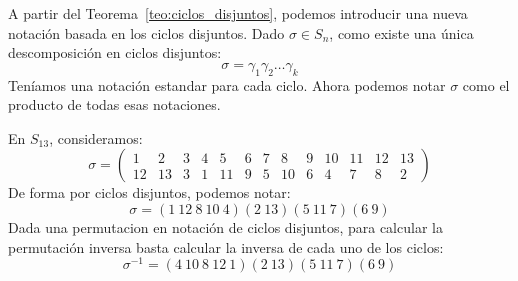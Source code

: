 \begin{notacion}
    A partir del Teorema~\ref{teo:ciclos_disjuntos}, podemos introducir una nueva notación basada en los ciclos disjuntos. Dado $\sigma\in S_n$, como existe una única descomposición en ciclos disjuntos:
    \begin{equation*}
        \sigma=\gamma_1\gamma_2\ldots\gamma_k
    \end{equation*}
    Teníamos una notación estandar para cada ciclo. Ahora podemos notar $\sigma$ como el producto de todas esas notaciones.
\end{notacion}

\begin{ejemplo}
    En $S_{13}$, consideramos:
    \begin{equation*}
        \sigma = \left(\begin{array}{ccccccccccccc}
                1 & 2 & 3 & 4 & 5 & 6 & 7 & 8 & 9 & 10 & 11 & 12 & 13 \\
                12 & 13 & 3 & 1 & 11 & 9 & 5 & 10 & 6 & 4 & 7 & 8 & 2
        \end{array}\right)
    \end{equation*}
    De forma por ciclos disjuntos, podemos notar:
    \begin{equation*}
        \sigma = (1\ 12\ 8\ 10\ 4)(2\ 13)(5\ 11\ 7)(6\ 9)
    \end{equation*}
    Dada una permutacion en notación de ciclos disjuntos, para calcular la permutación inversa basta calcular la inversa de cada uno de los ciclos:
    \begin{equation*}
        \sigma^{-1} = (4\ 10\ 8\ 12\ 1)(2\ 13)(5\ 11\ 7)(6\ 9)
    \end{equation*}
\end{ejemplo}

